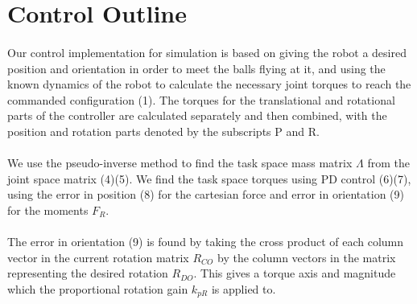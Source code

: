 \documentclass[10pt,a4paper,notitlepage]{report}
\begin{document}
\section*{Control Outline}
\paragraph*{}
Our control implementation for simulation is based on giving the robot a desired position
and orientation in order to meet the balls flying at it, and using the known dynamics of the robot to calculate the necessary joint torques to reach the commanded configuration (1). The torques for the translational and rotational parts of the controller
are calculated separately and then combined, with the position and rotation parts denoted
by the subscripts P and R. 
\paragraph*{} 
We use the pseudo-inverse method to 
find the task space mass matrix $\Lambda$
from the joint space matrix (4)(5). We find the task space torques using PD control (6)(7), 
using the error in position (8) for the cartesian force and error in orientation (9) 
for the moments $F_{R}$. 
\paragraph*{}

The error in orientation (9) is found by taking the cross product of each column vector in the 
current rotation matrix $R_{CO}$ by the column vectors in the matrix 
representing the desired rotation $R_{DO}$. This gives a torque axis and magnitude which the proportional rotation gain $k_{pR}$ is applied to.

     
\end{document}

